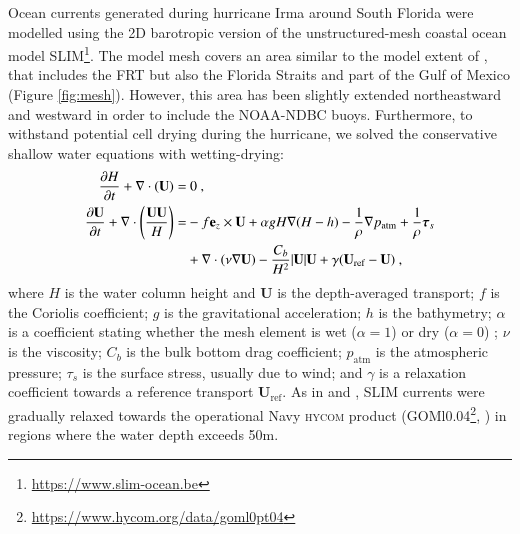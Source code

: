 \documentclass[preprint,12pt,authoryear]{elsarticle}
\newcommand{\hycom}{\textsc{hycom} }
\newcommand{\UV}{\mathbf{U}}
\begin{document}
Ocean currents generated during hurricane Irma around South Florida were modelled using the 2D barotropic version of the unstructured-mesh coastal ocean model SLIM\footnote{\url{https://www.slim-ocean.be}}. The model mesh covers an area similar to the model extent of \cite{dobbelaere2020coupled}, that includes the FRT but also the Florida Straits and part of the Gulf of Mexico (Figure \ref{fig:mesh}). However, this area has been slightly extended northeastward and westward in order to include the NOAA-NDBC buoys. Furthermore, to withstand potential cell drying during the hurricane, we solved the conservative shallow water equations with wetting-drying:
\begin{equation}
    \begin{split}
        \dfrac{\partial H}{\partial t} +\nabla\cdot(\UV) =& ~0~, \\
        \dfrac{\partial \UV}{\partial t}  + \nabla\cdot\left(\dfrac{\UV\UV}{H}\right) =& -f\mathbf{e}_z \times \UV + \alpha gH\nabla(H-h) - \dfrac{1}{\rho}\nabla p_\text{atm} + \dfrac{1}{\rho}\text{\boldmath$\tau$}_s \\
         &+\nabla\cdot(\nu\nabla\UV) - \dfrac{C_b}{H^2}|\UV|\UV + \gamma(\UV_\text{ref}-\UV)~,
    \end{split} \label{eq:slim}
\end{equation}
where $H$ is the water column height and $\UV$ is the depth-averaged transport; $f$ is the Coriolis coefficient; $g$ is the gravitational acceleration; $h$ is the bathymetry; $\alpha$ is a coefficient stating whether the mesh element is wet ($\alpha=1$) or dry ($\alpha=0$) \citep{le2020implicit}; $\nu$  is the viscosity; $C_b$ is the bulk bottom drag coefficient; $p_\text{atm}$ is the atmospheric pressure; {\boldmath$\tau$}$_s$ is the surface stress, usually due to wind; and $\gamma$ is a relaxation coefficient towards a reference transport $\UV_\text{ref}$. As in \cite{frys2020fine} and \cite{dobbelaere2020coupled}, SLIM currents were gradually relaxed towards the operational Navy \hycom product (GOMl0.04\footnote{\url{https://www.hycom.org/data/goml0pt04}}, \cite{chassignet2007hycom}) in regions where the water depth exceeds 50m.
\end{document}

